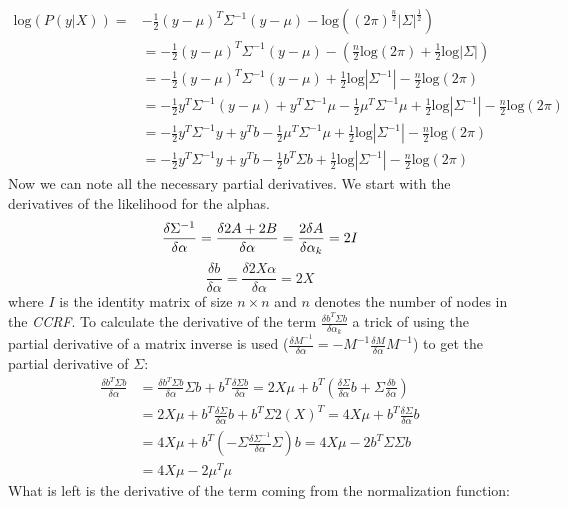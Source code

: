 \begin{equation}
\begin{split}
\text{log}(P(y|X)) = & -\frac{1}{2}(y-\mu)^T \Sigma^{-1} (y-\mu) - \text{log}((2\pi)^{\frac{n}{2}}|\Sigma | ^{\frac{1}{2}}) \\
& = -\frac{1}{2}(y-\mu)^T \Sigma^{-1} (y-\mu) -  (\frac{n}{2}\text{log}(2\pi) + \frac{1}{2}\text{log} | \Sigma | ) \\
& = -\frac{1}{2}(y-\mu)^T \Sigma^{-1} (y-\mu) + \frac{1}{2}\text{log} |\Sigma^{-1}| -\frac{n}{2}\text{log} (2\pi) \\
& = -\frac{1}{2}y^T \Sigma^{-1} (y-\mu) + y^T \Sigma^{-1} \mu - \frac{1}{2} \mu^T \Sigma^{-1} \mu +\frac{1}{2}\text{log} | \Sigma^{-1} | - \frac{n}{2}\text{log}(2\pi)\\
& = -\frac{1}{2} y^T \Sigma^{-1} y + y^T b - \frac{1}{2}\mu^T \Sigma^{-1} \mu + \frac{1}{2}\text{log} |\Sigma^{-1}| - \frac{n}{2}\text{log}(2\pi)\\
& = -\frac{1}{2} y^T \Sigma^{-1} y + y^T b - \frac{1}{2}b^T \Sigma b +\frac{1}{2}\text{log} |\Sigma^{-1}| -\frac{n}{2}\text{log}(2\pi)
\end{split}
\end{equation}
Now we can note all the necessary partial derivatives. We start with the derivatives of the likelihood for the alphas.
\begin{equation}
\frac{\delta \Sigma^{-1}}{\delta \alpha} = \frac{\delta 2A + 2B}{\delta \alpha} = \frac{2\delta A}{\delta \alpha_k} = 2I \\
\end{equation}
\begin{equation}
\frac{\delta b}{\delta \alpha} = \frac{\delta 2 X \alpha}{\delta \alpha} = 2X
\end{equation}
where $I$ is the identity matrix of size $n\times n$ and $n$ denotes the number of nodes in the \textit{CCRF}. 
To calculate the derivative of the term $\frac{\delta b^T \Sigma b}{\delta \alpha_k}$ a trick of using the partial derivative of a matrix inverse is used ($\frac{\delta M^{-1}}{\delta \alpha} = - M^{-1}\frac{\delta M}{\delta \alpha}M^{-1}$) to get the partial derivative of $\Sigma$:
\begin{equation}
\begin{split}
\frac{\delta b^T \Sigma b }{\delta \alpha} & = \frac{\delta b^T \Sigma b}{\delta \alpha } \Sigma b + b^T \frac{\delta \Sigma b}{\delta \alpha } = 2X\mu +b^T (\frac{\delta \Sigma }{\delta \alpha} b + \Sigma \frac{\delta b}{\delta \alpha}) \\
& = 2X \mu + b^T \frac{\delta \Sigma}{\delta \alpha} b + b^T \Sigma 2(X)^T = 4 X \mu + b^T \frac{\delta \Sigma }{\delta \alpha} b \\
& = 4X\mu + b^T (-\Sigma \frac{\delta \Sigma^{-1}}{\delta \alpha} \Sigma)b = 4X \mu -2b^T\Sigma \Sigma b \\
& = 4X \mu - 2\mu^T \mu
\end{split}
\end{equation}
 What is left is the derivative of the term coming from the normalization function:
 
